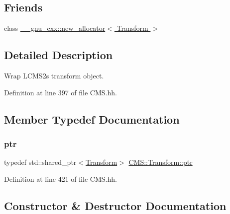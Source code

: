 \subsection*{Friends}
\begin{DoxyCompactItemize}
\item 
class \hyperlink{class_c_m_s_1_1_transform_aaeda30953f033efa311d71a812180996}{\+\_\+\+\_\+gnu\+\_\+cxx\+::new\+\_\+allocator$<$ Transform $>$}
\end{DoxyCompactItemize}


\subsection{Detailed Description}
Wrap L\+C\+M\+S2\textquotesingle{}s transform object. 

Definition at line 397 of file C\+M\+S.\+hh.



\subsection{Member Typedef Documentation}
\mbox{\label{class_c_m_s_1_1_transform_ac0fcc21ddc52273f9ce95dba97ef1116}} 
\subsubsection{\texorpdfstring{ptr}{ptr}}
{\footnotesize\ttfamily typedef std\+::shared\+\_\+ptr$<$\hyperlink{class_c_m_s_1_1_transform}{Transform}$>$ \hyperlink{class_c_m_s_1_1_transform_ac0fcc21ddc52273f9ce95dba97ef1116}{C\+M\+S\+::\+Transform\+::ptr}}



Definition at line 421 of file C\+M\+S.\+hh.



\subsection{Constructor \& Destructor Documentation}
\mbox{\label{class_c_m_s_1_1_transform_a55f27c5ecf8005a39792686930395827}} 

